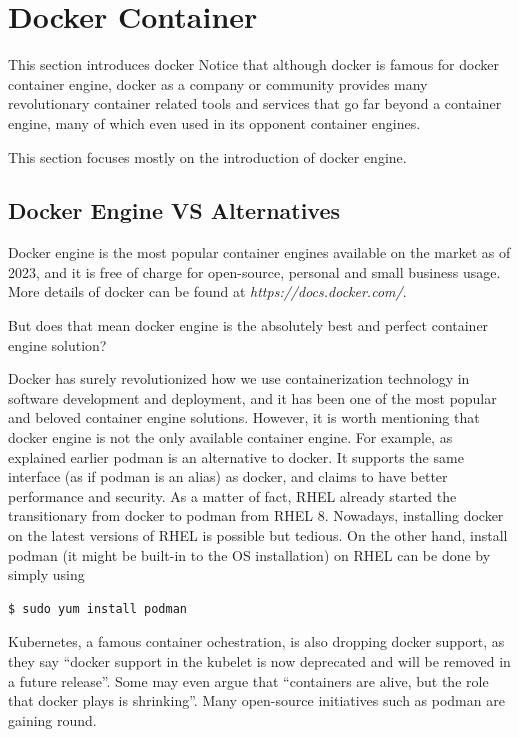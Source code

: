 \section{Docker Container} \label{ch:vac:sec:dc}

This section introduces docker Notice that although docker is famous for docker container engine, docker as a company or community provides many revolutionary container related tools and services that go far beyond a container engine, many of which even used in its opponent container engines.

This section focuses mostly on the introduction of docker engine.

\subsection{Docker Engine VS Alternatives}

Docker engine is the most popular container engines available on the market as of 2023, and it is free of charge for open-source, personal and small business usage. More details of docker can be found at \textit{https://docs.docker.com/}.

But does that mean docker engine is the absolutely best and perfect container engine solution?

Docker has surely revolutionized how we use containerization technology in software development and deployment, and it has been one of the most popular and beloved container engine solutions. However, it is worth mentioning that docker engine is not the only available container engine. For example, as explained earlier podman is an alternative to docker. It supports the same interface (as if podman is an alias) as docker, and claims to have better performance and security. As a matter of fact, RHEL already started the transitionary from docker to podman from RHEL 8. Nowadays, installing docker on the latest versions of RHEL is possible but tedious. On the other hand, install podman (it might be built-in to the OS installation) on RHEL can be done by simply using
\begin{lstlisting}
$ sudo yum install podman
\end{lstlisting}
Kubernetes, a famous container ochestration, is also dropping docker support, as they say ``docker support in the kubelet is now deprecated and will be removed in a future release''. Some may even argue that ``containers are alive, but the role that docker plays is shrinking''. Many open-source initiatives such as podman are gaining round.

